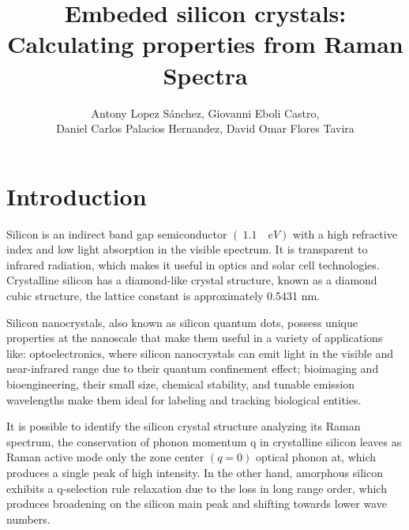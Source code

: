 \documentclass[a4paper,10pt,twocolumn]{article}
\title{Embeded silicon crystals: Calculating properties from Raman Spectra}
\author{Antony Lopez Sánchez, Giovanni Eboli Castro, \\ Daniel Carlos Palacios Hernandez, David Omar Flores Tavira}
\begin{document}

\section{Introduction}

Silicon is an indirect band gap semiconductor $ (~1.1 \quad eV) $ with a high refractive index and low light absorption in the visible spectrum. It is transparent to infrared radiation, which makes it useful in optics and solar cell technologies. Crystalline silicon has a diamond-like crystal structure, known as a diamond cubic structure, the lattice constant is approximately 0.5431 nm.

Silicon nanocrystals, also known as silicon quantum dots, possess unique properties at the nanoscale that make them useful in a variety of applications like: optoelectronics, where silicon nanocrystals can emit light in the visible and near-infrared range due to their quantum confinement effect; bioimaging and bioengineering, their small size, chemical stability, and tunable emission wavelengths make them ideal for labeling and tracking biological entities.

It is possible to identify the silicon crystal structure analyzing its Raman spectrum, the conservation of phonon momentum q in crystalline silicon leaves as Raman active mode only the zone center $(q=0) $ optical phonon at, which produces a single peak of high intensity. In the other hand, amorphous silicon exhibits a q-selection rule relaxation due to the loss in long range order, which produces broadening on the silicon main peak and shifting towards lower wave numbers.
\end{document}

